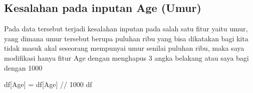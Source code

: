 \documentclass[
  letterpaper,
]{krantz}
\makeatletter
\newenvironment{Shaded}{\begin{snugshade}}{\end{snugshade}}
\newcommand{\DecValTok}[1]{\textcolor[rgb]{0.68,0.00,0.00}{#1}}
\newcommand{\NormalTok}[1]{\textcolor[rgb]{0.00,0.23,0.31}{#1}}
\newcommand{\OperatorTok}[1]{\textcolor[rgb]{0.37,0.37,0.37}{#1}}
\newcommand{\StringTok}[1]{\textcolor[rgb]{0.13,0.47,0.30}{#1}}
\newenvironment{kframe}{%
\medskip{}
\setlength{\fboxsep}{.8em}
 \def\at@end@of@kframe{}%
 \ifinner\ifhmode%
  \def\at@end@of@kframe{\end{minipage}}%
  \begin{minipage}{\columnwidth}%
 \fi\fi%
 \def\FrameCommand##1{\hskip\@totalleftmargin \hskip-\fboxsep
 \colorbox{shadecolor}{##1}\hskip-\fboxsep
     \hskip-\linewidth \hskip-\@totalleftmargin \hskip\columnwidth}%
 \MakeFramed {\advance\hsize-\width
   \@totalleftmargin\z@ \linewidth\hsize
   \@setminipage}}%
 {\par\unskip\endMakeFramed%
 \at@end@of@kframe}
\renewenvironment{Shaded}{\begin{kframe}}{\end{kframe}}
\makeatother
\begin{document}
\hypertarget{kesalahan-pada-inputan-age-umur}{%
\subsection*{Kesalahan pada inputan Age
(Umur)}\label{kesalahan-pada-inputan-age-umur}}

Pada data tersebut terjadi kesalahan inputan pada salah satu fitur yaitu
umur, yang dimana umur tersebut berupa puluhan ribu yang bisa dikatakan
bagi kita tidak masuk akal seseorang mempunyai umur senilai puluhan
ribu, maka saya modifikasi hanya fitur Age dengan menghapus 3 angka
belakang atau saya bagi dengan 1000

\begin{Shaded}
\begin{Highlighting}[]
\NormalTok{df[}\StringTok{\textquotesingle{}Age\textquotesingle{}}\NormalTok{] }\OperatorTok{=}\NormalTok{ df[}\StringTok{\textquotesingle{}Age\textquotesingle{}}\NormalTok{] }\OperatorTok{//} \DecValTok{1000}
\NormalTok{df}
\end{Highlighting}
\end{Shaded}
\end{document}
